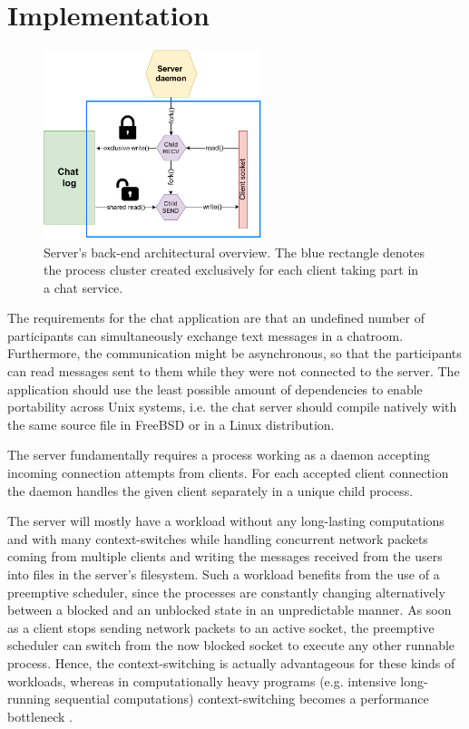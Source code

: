 \section{Implementation}
\begin{figure}[!t]
	\centering
	\includegraphics[width=2.5in]{img/server.pdf}
	\caption{Server's back-end architectural overview. The blue rectangle denotes the process cluster created exclusively for each client taking part in a chat service.}
	\label{fig_server_backend}
\end{figure}
The requirements for the chat application are that an undefined number of participants can simultaneously exchange text messages in a chatroom. Furthermore, the communication might be asynchronous, so that the participants can read messages sent to them while they were not connected to the server. The application should use the least possible amount of dependencies to enable portability across Unix systems, i.e. the chat server should compile natively with the same source file in FreeBSD or in a Linux distribution.

The server fundamentally requires a process working as a daemon accepting incoming connection attempts from clients. For each accepted client connection the daemon handles the given client separately in a unique child process.

The server will mostly have a workload without any long-lasting computations and with many context-switches while handling concurrent network packets coming from multiple clients and writing the messages received from the users into files in the server's filesystem. Such a workload benefits from the use of a preemptive scheduler, since the processes are constantly changing alternatively between a blocked and an unblocked state in an unpredictable manner. As soon as a client stops sending network packets to an active socket, the preemptive scheduler can switch from the now blocked socket to execute any other runnable process. Hence, the context-switching is actually advantageous for these kinds of workloads, whereas in computationally heavy programs (e.g. intensive long-running sequential computations) context-switching becomes a performance bottleneck \cite{Kennedy2018}.

